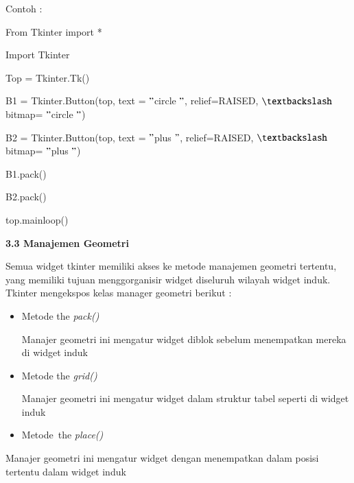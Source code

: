 \documentclass[a4paper,12pt]{report}
\begin{document}
\begin{myEnumerate}
 \par
\vspace{12pt}
Contoh : \par
{\fontsize{10pt}{10pt}\selectfont From Tkinter import *} \par
{\fontsize{10pt}{10pt}\selectfont Import Tkinter} \par
\vspace{10pt}
{\fontsize{10pt}{10pt}\selectfont Top = Tkinter.Tk()} \par
\vspace{10pt}
{\fontsize{10pt}{10pt}\selectfont B1 = Tkinter.Button(top, text = $ " $circle $ " $, relief=RAISED,  $  \textbackslash  $ bitmap= $ " $circle $ " $)} \par
{\fontsize{10pt}{10pt}\selectfont B2 = Tkinter.Button(top, text = $ " $plus $ " $, relief=RAISED,  $  \textbackslash  $ bitmap= $ " $plus $ " $)} \par
\vspace{10pt}
{\fontsize{10pt}{10pt}\selectfont B1.pack()} \par
{\fontsize{10pt}{10pt}\selectfont B2.pack()} \par
{\fontsize{10pt}{10pt}\selectfont top.mainloop()} \par
\vspace{10pt}
\noindent 
\textbf{3.3 Manajemen Geometri} \par
\noindent 
 \hspace*{0.5in} Semua widget tkinter memiliki akses ke metode manajemen geometri tertentu, yang memiliki tujuan menggorganisir widget diseluruh wilayah widget induk. Tkinter mengekspos kelas manager geometri berikut : \par
\noindent 
\begin{itemize}
\item Metode the \textit{pack()} \par
\noindent 
Manajer geometri ini mengatur widget diblok sebelum menempatkan mereka di widget induk \par
\noindent 
\item Metode the \textit{grid()} \par
\noindent 
Manajer geometri ini mengatur widget dalam struktur tabel seperti di widget induk \par
\noindent 
\item Metode~the  \textit{place()}\end{itemize}
 \par
\noindent 
Manajer geometri ini mengatur widget dengan menempatkan dalam posisi tertentu dalam widget induk \par

\end{myEnumerate}
\end{document}
